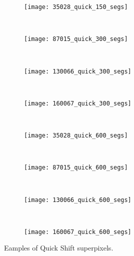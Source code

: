 \begin{figure}[!ht]
    \begin{subfigure}[t]{\textwidth+20pt\relax}
    	\texttt{[image: 35028\_quick\_150\_segs]} 
    \end{subfigure}      
    ~ %
    \begin{subfigure}[b]{0.2\textwidth}
        \texttt{[image: 87015\_quick\_300\_segs]}
    \end{subfigure}
    ~ %
    \begin{subfigure}[b]{0.2\textwidth}
        \texttt{[image: 130066\_quick\_300\_segs]}
    \end{subfigure}
    ~ %
    \begin{subfigure}[b]{0.2\textwidth}
        \texttt{[image: 160067\_quick\_300\_segs]}
    \end{subfigure} \\ [2ex]
    
    \begin{subfigure}[t]{\textwidth+20pt\relax}
    	\texttt{[image: 35028\_quick\_600\_segs]} 
    \end{subfigure}      
    ~ %
    \begin{subfigure}[b]{0.2\textwidth}
        \texttt{[image: 87015\_quick\_600\_segs]}
    \end{subfigure}
    ~ %
    \begin{subfigure}[b]{0.2\textwidth}
        \texttt{[image: 130066\_quick\_600\_segs]}
    \end{subfigure}
    ~ %
    \begin{subfigure}[b]{0.2\textwidth}
        \texttt{[image: 160067\_quick\_600\_segs]}
    \end{subfigure}     

	\caption{Eamples of Quick Shift superpixels.}\label{fig:quick_suprepixels}    
\end{figure}

